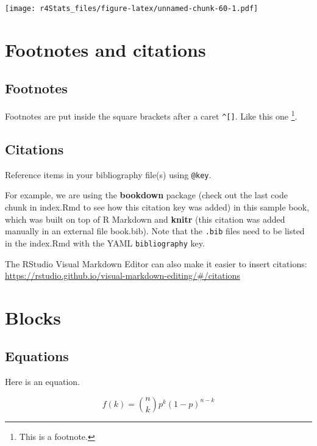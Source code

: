 \documentclass[
]{book}
\theoremstyle{definition}
\theoremstyle{definition}
\theoremstyle{definition}
\theoremstyle{definition}
\theoremstyle{remark}
\begin{document}
\texttt{[image: r4Stats\_files/figure-latex/unnamed-chunk-60-1.pdf]}

\hypertarget{footnotes-and-citations}{%
\chapter{Footnotes and citations}\label{footnotes-and-citations}}

\hypertarget{footnotes}{%
\section{Footnotes}\label{footnotes}}

Footnotes are put inside the square brackets after a caret \texttt{\^{}{[}{]}}. Like this one \footnote{This is a footnote.}.

\hypertarget{citations}{%
\section{Citations}\label{citations}}

Reference items in your bibliography file(s) using \texttt{@key}.

For example, we are using the \textbf{bookdown} package \citep{R-bookdown} (check out the last code chunk in index.Rmd to see how this citation key was added) in this sample book, which was built on top of R Markdown and \textbf{knitr} \citep{xie2015} (this citation was added manually in an external file book.bib).
Note that the \texttt{.bib} files need to be listed in the index.Rmd with the YAML \texttt{bibliography} key.

The RStudio Visual Markdown Editor can also make it easier to insert citations: \url{https://rstudio.github.io/visual-markdown-editing/\#/citations}

\hypertarget{blocks}{%
\chapter{Blocks}\label{blocks}}

\hypertarget{equations}{%
\section{Equations}\label{equations}}

Here is an equation.

\begin{equation} 
  f\left(k\right) = \binom{n}{k} p^k\left(1-p\right)^{n-k}
  \label{eq:binom}
\end{equation}
\end{document}
